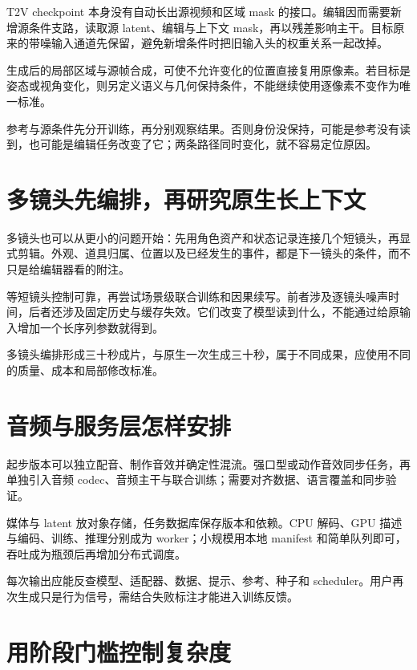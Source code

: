 T2V checkpoint 本身没有自动长出源视频和区域 mask 的接口。编辑因而需要新增源条件支路，读取源 latent、编辑与上下文 mask，再以残差影响主干。目标原来的带噪输入通道先保留，避免新增条件时把旧输入头的权重关系一起改掉。

生成后的局部区域与源帧合成，可使不允许变化的位置直接复用原像素。若目标是姿态或视角变化，则另定义语义与几何保持条件，不能继续使用逐像素不变作为唯一标准。

参考与源条件先分开训练，再分别观察结果。否则身份没保持，可能是参考没有读到，也可能是编辑任务改变了它；两条路径同时变化，就不容易定位原因。

\section{多镜头先编排，再研究原生长上下文}\label{seedance-m12-ux591aux955cux5934ux5148ux7f16ux6392ux518dux7814ux7a76ux539fux751fux957fux4e0aux4e0bux6587}

多镜头也可以从更小的问题开始：先用角色资产和状态记录连接几个短镜头，再显式剪辑。外观、道具归属、位置以及已经发生的事件，都是下一镜头的条件，而不只是给编辑器看的附注。

等短镜头控制可靠，再尝试场景级联合训练和因果续写。前者涉及逐镜头噪声时间，后者还涉及固定历史与缓存失效。它们改变了模型读到什么，不能通过给原输入增加一个长序列参数就得到。

多镜头编排形成三十秒成片，与原生一次生成三十秒，属于不同成果，应使用不同的质量、成本和局部修改标准。

\section{音频与服务层怎样安排}\label{seedance-m12-ux97f3ux9891ux4e0eux670dux52a1ux5c42ux600eux6837ux5b89ux6392}

起步版本可以独立配音、制作音效并确定性混流。强口型或动作音效同步任务，再单独引入音频 codec、音频主干与联合训练；需要对齐数据、语言覆盖和同步验证。

媒体与 latent 放对象存储，任务数据库保存版本和依赖。CPU 解码、GPU 描述与编码、训练、推理分别成为 worker；小规模用本地 manifest 和简单队列即可，吞吐成为瓶颈后再增加分布式调度。

每次输出应能反查模型、适配器、数据、提示、参考、种子和 scheduler。用户再次生成只是行为信号，需结合失败标注才能进入训练反馈。

\section{用阶段门槛控制复杂度}\label{seedance-m12-ux7528ux9636ux6bb5ux95e8ux69dbux63a7ux5236ux590dux6742ux5ea6}

